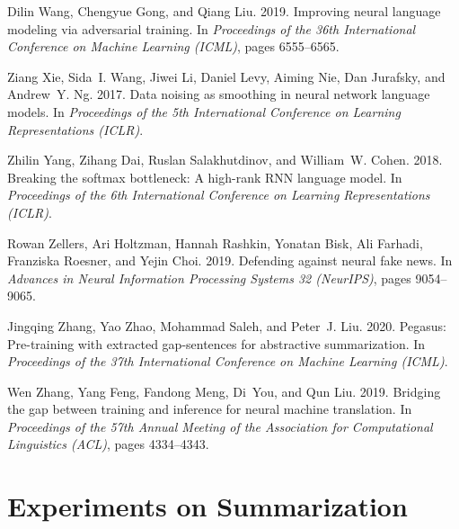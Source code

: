 \documentclass[11pt]{article}
\begin{document}
\begin{thebibliography}{47}
Dilin Wang, Chengyue Gong, and Qiang Liu. 2019.
\newblock Improving neural language modeling via adversarial training.
\newblock In \emph{Proceedings of the 36th International Conference on Machine
  Learning (ICML)}, pages 6555--6565.

Ziang Xie, Sida~I. Wang, Jiwei Li, Daniel Levy, Aiming Nie, Dan Jurafsky, and
  Andrew~Y. Ng. 2017.
\newblock Data noising as smoothing in neural network language models.
\newblock In \emph{Proceedings of the 5th International Conference on Learning
  Representations (ICLR)}.

Zhilin Yang, Zihang Dai, Ruslan Salakhutdinov, and William~W. Cohen. 2018.
\newblock Breaking the softmax bottleneck: {A} high-rank {RNN} language model.
\newblock In \emph{Proceedings of the 6th International Conference on Learning
  Representations (ICLR)}.

Rowan Zellers, Ari Holtzman, Hannah Rashkin, Yonatan Bisk, Ali Farhadi,
  Franziska Roesner, and Yejin Choi. 2019.
\newblock Defending against neural fake news.
\newblock In \emph{Advances in Neural Information Processing Systems 32
  (NeurIPS)}, pages 9054--9065.

Jingqing Zhang, Yao Zhao, Mohammad Saleh, and Peter~J. Liu. 2020.
\newblock Pegasus: Pre-training with extracted gap-sentences for abstractive
  summarization.
\newblock In \emph{Proceedings of the 37th International Conference on Machine
  Learning (ICML)}.

Wen Zhang, Yang Feng, Fandong Meng, Di~You, and Qun Liu. 2019.
\newblock Bridging the gap between training and inference for neural machine
  translation.
\newblock In \emph{Proceedings of the 57th Annual Meeting of the Association
  for Computational Linguistics (ACL)}, pages 4334--4343.

\end{thebibliography}
 
\clearpage

\appendix

\section{Experiments on Summarization}
\label{sec:exp_summarization}
\end{document}
